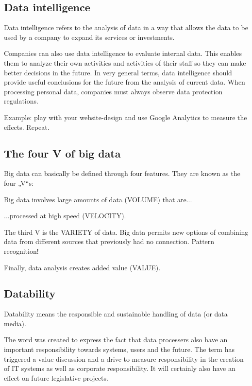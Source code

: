 \subsection{Data intelligence}
\begin{compactitem}
	\item Data intelligence refers to the analysis of data in a way that allows the	data to be used by a company to expand its services or investments.
	\item Companies can also use data intelligence to evaluate internal data. This enables them to analyze their own activities and activities of their staff so they can make better decisions in the future. In very general terms, data intelligence should provide useful conclusions for the future from the analysis of current data. When processing personal data, companies must always observe data protection regulations.
	\item Example: play with your website-design and use Google Analytics to measure the effects. Repeat.
\end{compactitem}

\subsection{The four V of big data}
Big data can basically be defined through four features. They are known as the four „V“s:
\begin{compactitem}
	\item Big data involves large amounts of data (VOLUME) that are...
	\item ...processed at high speed (VELOCITY).
	\item The third V is the VARIETY of data. Big data permits new options of combining data from different sources that previously had no connection. Pattern recognition!
	\item Finally, data analysis creates added value (VALUE).
\end{compactitem}

\subsection{Datability}
\begin{compactitem}
	\item Datability means the responsible and sustainable handling of data (or data media).
	\item The word was created to express the fact that data processers also have an important responsibility towards systems, users and the future. The term has triggered a value discussion and a drive to measure responsibility in the creation of IT systems as well as corporate responsibility. It will certainly also have an effect on future legislative projects.
\end{compactitem}

